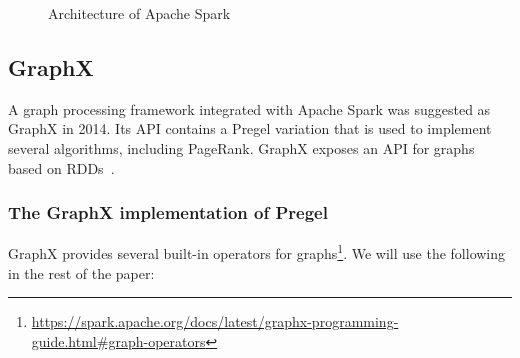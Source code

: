 \begin{figure}[ht]
    \centering
    
    \caption[Architecture of Apache Spark]{Architecture of Apache Spark\footnotemark}
    \label{fig:architecture:apacheSpark}
\end{figure}


\subsection{GraphX}

A graph processing framework integrated with Apache Spark was suggested as GraphX in 2014. Its API contains a Pregel variation that is used to implement several algorithms, including PageRank. GraphX exposes an API for graphs based on RDDs~\cite{https://doi.org/10.48550/arxiv.2110.11709}.

\subsubsection{The GraphX implementation of Pregel}

GraphX provides several built-in operators for graphs\footnote{\url{https://spark.apache.org/docs/latest/graphx-programming-guide.html\#graph-operators}}. We will use the following in the rest of the paper:

